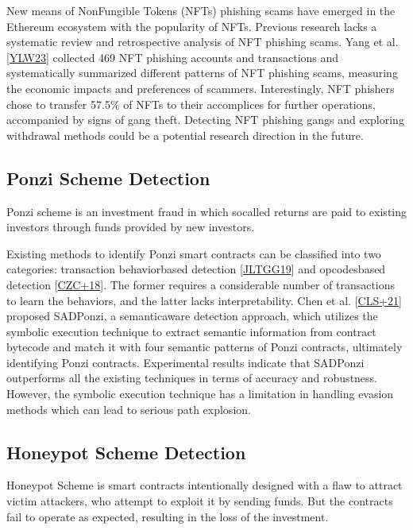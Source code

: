\documentclass[letterpaper,10pt,english]{jupyterBook}
\begin{document}
\sphinxAtStartPar
New means of Non\sphinxhyphen{}Fungible Tokens (NFTs) phishing scams have emerged in the Ethereum ecosystem with the popularity of NFTs. Previous research lacks a systematic review and retrospective analysis of NFT phishing scams. Yang et al. {[}\hyperlink{cite.SDE/ScamDetec:id135}{YLW23}{]} collected 469 NFT phishing accounts and transactions and systematically summarized different patterns of NFT phishing scams, measuring the economic impacts and preferences of scammers. Interestingly, NFT phishers chose to transfer 57.5\% of NFTs to their accomplices for further operations, accompanied by signs of gang theft. Detecting NFT phishing gangs and exploring withdrawal methods could be a potential research direction in the future.


\subsection{Ponzi Scheme Detection}
\label{\detokenize{SDE/ScamDetec:ponzi-scheme-detection}}
\begin{sphinxShadowBox}

\sphinxAtStartPar
Ponzi scheme is an investment fraud in which so\sphinxhyphen{}called returns are paid to existing investors through funds provided by new investors.
\end{sphinxShadowBox}

\sphinxAtStartPar
Existing methods to identify Ponzi smart contracts can be classified into two categories: transaction behavior\sphinxhyphen{}based detection {[}\hyperlink{cite.SDE/ScamDetec:id137}{JLTGG19}{]} and opcodes\sphinxhyphen{}based detection {[}\hyperlink{cite.SDE/ScamDetec:id138}{CZC+18}{]}. The former requires a considerable number of transactions to learn the behaviors, and the latter lacks interpretability. Chen et al. {[}\hyperlink{cite.SDE/ScamDetec:id136}{CLS+21}{]} proposed SADPonzi, a semantic\sphinxhyphen{}aware detection approach, which utilizes the symbolic execution technique to extract semantic information from contract bytecode and match it with four semantic patterns of Ponzi contracts, ultimately identifying Ponzi contracts. Experimental results indicate that SADPonzi outperforms all the existing techniques in terms of accuracy and robustness. However, the symbolic execution technique has a limitation in handling evasion methods which can lead to serious path explosion.


\subsection{Honeypot Scheme Detection}
\label{\detokenize{SDE/ScamDetec:honeypot-scheme-detection}}
\begin{sphinxShadowBox}

\sphinxAtStartPar
Honeypot Scheme is smart contracts intentionally designed with a flaw to attract victim attackers, who attempt to exploit it by sending funds. But the contracts fail to operate as expected, resulting in the loss of the investment.
\end{sphinxShadowBox}
\end{document}
